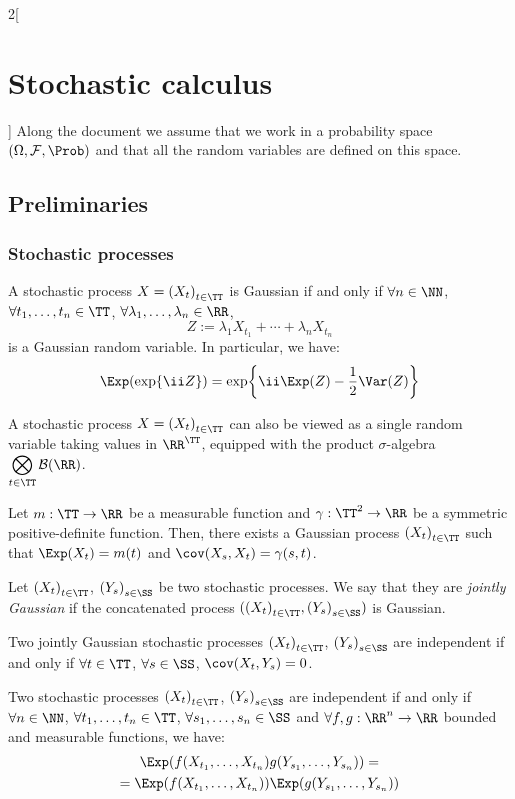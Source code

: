 \documentclass[../../../main_math.tex]{subfiles}
\begin{document}
\begin{multicols}{2}[\section{Stochastic calculus}]
  Along the document we assume that we work in a probability space $(\Omega,\mathcal{F},\Prob)$ and that all the random variables are defined on this space.
  \subsection{Preliminaries}
  \subsubsection{Stochastic processes}
  \begin{proposition}
    A stochastic process $X={(X_t)}_{t\in \TT}$ is Gaussian if and only if $\forall n\in\NN$, $\forall t_1,\ldots,t_n\in\TT$, $\forall \lambda_1,\ldots,\lambda_n\in\RR$,
    $$
      Z:=\lambda_1 X_{t_1}+\cdots+\lambda_n X_{t_n}
    $$
    is a Gaussian random variable. In particular, we have:
    $$
      \Exp(\exp{\ii Z})=\exp{\ii \Exp(Z)-\frac{1}{2}\Var(Z)}
    $$
  \end{proposition}
  \begin{remark}
    A stochastic process $X={(X_t)}_{t\in \TT}$ can also be viewed as a single random variable taking values in $\RR^{\TT}$, equipped with the product $\sigma$-algebra $\displaystyle \bigotimes_{t\in\TT}\mathcal{B}(\RR)$.
  \end{remark}
  \begin{proposition}
    Let $m:\TT\to\RR$ be a measurable function and $\gamma:\TT^2\to\RR$ be a symmetric positive-definite function. Then, there exists a Gaussian process ${(X_t)}_{t\in \TT}$ such that $\Exp(X_t)=m(t)$ and $\cov(X_s,X_t)=\gamma(s,t)$.
  \end{proposition}
  \begin{definition}
    Let ${(X_t)}_{t\in \TT}$, ${(Y_s)}_{s\in \SS}$ be two stochastic processes. We say that they are \emph{jointly Gaussian} if the concatenated process $({(X_t)}_{t\in \TT},{(Y_s)}_{s\in \SS})$ is Gaussian.
  \end{definition}
  \begin{lemma}\label{SC:indep_joint_gauss}
    Two jointly Gaussian stochastic processes ${(X_t)}_{t\in \TT}$, ${(Y_s)}_{s\in \SS}$ are independent if and only if $\forall t\in\TT$, $\forall s\in\SS$, $\cov(X_t,Y_s)=0$.
  \end{lemma}
  \begin{proposition}
    Two stochastic processes ${(X_t)}_{t\in \TT}$, ${(Y_s)}_{s\in \SS}$ are independent if and only if $\forall n\in\NN$, $\forall t_1,\ldots,t_n\in\TT$, $\forall s_1,\ldots,s_n\in\SS$ and $\forall f,g:\RR^n\to\RR$ bounded and measurable functions, we have:
    \begin{multline*}
      \Exp(f(X_{t_1},\ldots,X_{t_n})g(Y_{s_1},\ldots,Y_{s_n}))=\\=
      \Exp(f(X_{t_1},\ldots,X_{t_n}))\Exp(g(Y_{s_1},\ldots,Y_{s_n}))
    \end{multline*}
  \end{proposition}

\end{multicols}
\end{document}
